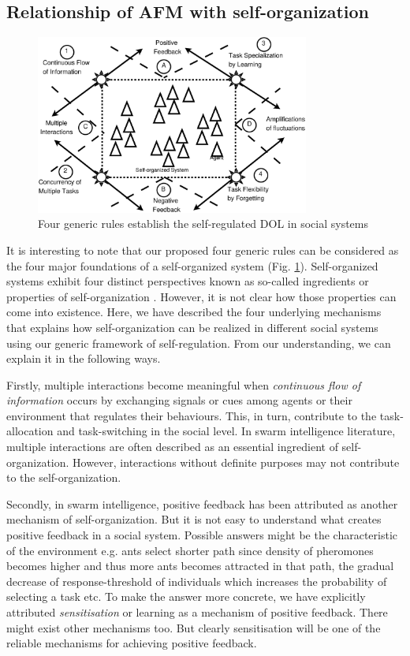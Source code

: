 \documentclass[preprint,12pt]{elsarticle}
\begin{document}
\subsection{Relationship of AFM with self-organization}
\label{afm:so}
\begin{figure}
\centering
\includegraphics[width=9cm, angle=0]
{./images/self-org-2.eps}
\caption{\small Four generic rules establish the self-regulated DOL in social systems}
\label{fig:afm-rules} %
\end{figure}

It is interesting to note that our proposed four generic rules can be considered as  the four major foundations of a self-organized system (Fig.  \ref{fig:afm-rules}). Self-organized systems exhibit four distinct perspectives known as so-called ingredients or properties of self-organization \cite{Camazine+2001}. However, it is not clear how those properties can come into existence. Here, we have described the four underlying mechanisms that explains how self-organization can be realized in different social systems using our generic framework of self-regulation. From our understanding, we can explain it in the following ways.

Firstly, multiple interactions become meaningful when {\em continuous flow of information} occurs  by exchanging signals or cues among agents or their environment  that regulates their behaviours. This, in turn, contribute to the task-allocation  and task-switching in the social level.  In swarm intelligence literature, multiple interactions are often described as an essential ingredient of self-organization. However, interactions without definite purposes may not contribute to the self-organization.

Secondly, in swarm intelligence, positive feedback has been attributed as another mechanism of  self-organization. But it is not easy to understand what creates positive feedback in a social system. Possible answers might be the characteristic of the environment e.g. ants select shorter path since density of pheromones becomes higher and thus more ants becomes attracted in that path, the gradual decrease of response-threshold of individuals which increases the probability of selecting a task etc.  To make the answer more concrete, we have explicitly attributed {\em sensitisation} or learning as a mechanism of positive feedback. There might exist other mechanisms too. But clearly sensitisation will be one of the reliable mechanisms for achieving positive feedback.
\end{document}
